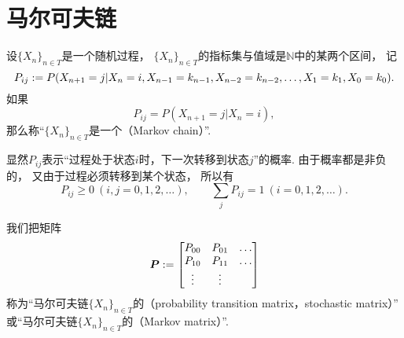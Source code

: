 \section{马尔可夫链}
\begin{definition}
设\(\{X_n\}_{n \in T}\)是一个随机过程，
\(\{X_n\}_{n \in T}\)的指标集与值域是\(\mathbb{N}\)中的某两个区间，
记\begin{equation*}
	P_{ij}
	:=
	P(
		X_{n+1} = j
		\vert
		X_n = i,
		X_{n-1} = k_{n-1},
		X_{n-2} = k_{n-2},
		\dotsc,
		X_1 = k_1,
		X_0 = k_0
	).
\end{equation*}
如果\begin{equation*}
	P_{ij}
	= P(
		X_{n+1} = j
		\vert
		X_n = i
	),
\end{equation*}
那么称“\(\{X_n\}_{n \in T}\)是一个（Markov chain）”.
\end{definition}

显然\(P_{ij}\)表示“过程处于状态\(i\)时，下一次转移到状态\(j\)”的概率.
由于概率都是非负的，
又由于过程必须转移到某个状态，
所以有\begin{equation*}
	P_{ij} \geq 0\ (i,j=0,1,2,\dotsc),
	\qquad
	\sum_j P_{ij} = 1\ (i=0,1,2,\dotsc).
\end{equation*}

我们把矩阵\begin{equation*}
	\boldsymbol{P}
	:= \begin{bmatrix}
		P_{00} & P_{01} & \dots \\
		P_{10} & P_{11} & \dots \\
		\vdots & \vdots & \\
	\end{bmatrix}
\end{equation*}
称为“马尔可夫链\(\{X_n\}_{n \in T}\)的（probability transition matrix，stochastic matrix）”
或“马尔可夫链\(\{X_n\}_{n \in T}\)的（Markov matrix）”.
